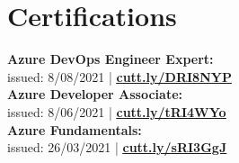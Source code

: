 \documentclass[a4paper,8pt]{article}
\begin{document}
\section{Certifications}
\color[HTML]{1C033C}\textbf{Azure DevOps Engineer Expert:} \\[2pt]
\color[HTML]{371e77} \hspace*{4ex} issued: 8/08/2021 | \textbf{\uline{\href{https://www.credly.com/badges/80f2454f-f8de-4e74-9575-a01edf459fde}{cutt.ly/DRI8NYP}}} \\[3pt]
\color[HTML]{1C033C}\textbf{Azure Developer Associate:} \\[2pt]
\color[HTML]{371e77} \hspace*{4ex} issued: 8/06/2021 | \textbf{\uline{\href{https://www.credly.com/badges/2b9449fa-ea3c-4baa-9362-2b1c6f69636e}{cutt.ly/tRI4WYo}}} \\[3pt]
\color[HTML]{1C033C}\textbf{Azure Fundamentals:} \\[2pt]
\color[HTML]{371e77} \hspace*{4ex} issued: 26/03/2021 | \textbf{\uline{\href{https://www.credly.com/badges/eb7f2969-df90-4138-b898-bcb9f57389e1}{cutt.ly/sRI3GgJ}}}
\end{document}
